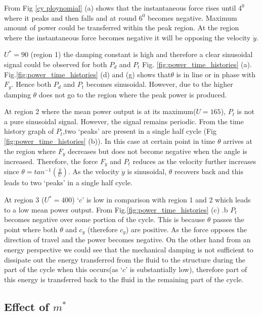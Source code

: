 From Fig \ref{cy ploynomial} (a) shows that the instantaneous force rises until $4^0$ where it peaks and then falls and at round $6^0$ becomes negative. Maximum amount of power could be transferred within the peak region. At the region where the instantaneous force becomes negative it will be opposing the velocity $\dot{y}$.

$U^*=90$ (region 1) the damping constant is high and therefore a clear sinusoidal signal could be observed for both $P_d$ and $P_t$ Fig. \ref{fig:power_time_histories} (a). Fig.\ref{fig:power_time_histories} (d) and (g) shows that$\theta$ is in line or in phase with $F_y$. Hence both $P_d$ and $P_t$ becomes sinusoidal. However, due to the higher damping  $\theta$ does not go to the region where the peak power is produced.

At region 2 where the mean power output is at its maximum($U=165$), $P_t$ is not a pure sinusoidal signal. However, the  signal remains periodic. From the time history graph of $P_t$,two `peaks' are present in a single half cycle (Fig \ref{fig:power_time_histories} (b)). In this case at certain point in time $\theta$ arrives at the region where $F_y$ decreases but does not become negative when the angle is increased. Therefore, the force $F_y$ and $P_t$ reduces as the velocity further increases since $\theta = tan^{-1}(\frac{\dot{y}}{U})$. As the velocity $\dot{y}$ is sinusoidal, $\theta$ recovers back and this leads to two `peaks'  in a single half cycle.

At region 3 ($U^*= 400$) `$c$' is low in comparison with region 1 and 2 which leads to a low mean power output. From Fig.\ref{fig:power_time_histories} (c) .b $P_t$ becomes negative over some portion of the cycle. This is because $\theta$  passes the point where both $\theta$ and $c_y$ (therefore $c_y$) are positive. As the force opposes the direction of travel and the power becomes negative. On the other hand from an energy perspective we could see that the mechanical damping is not sufficient to dissipate out the energy transferred from the fluid to the structure during the part of the cycle when this occurs(as `$c$' is substantially low), therefore  part of this energy is transferred back to the fluid in the remaining part of the cycle.

 
  

 



\subsection{Effect of $m^*$}

